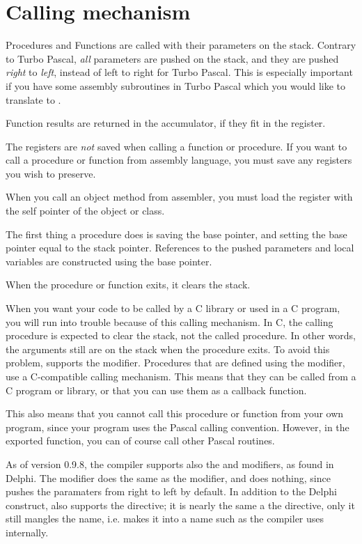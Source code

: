 \section{Calling mechanism}
\label{se:Calling}
Procedures and Functions are called with their parameters on the stack.
Contrary to Turbo Pascal, {\em all} parameters are pushed on the stack, and
they are pushed {\em right} to {\em left}, instead of left to right for
Turbo Pascal. This is especially important if you have some assembly
subroutines in Turbo Pascal which you would like to translate to \fpc.

Function results are returned in the accumulator, if they fit in the
register.

The registers are {\em not} saved when calling a function or procedure. If
you want to call a procedure or function from assembly language, you must
save any registers you wish to preserve.

When you call an object method from assembler, you must load the 
register with the self pointer of the object or class.

The first thing a procedure does is saving the base pointer, and setting the
base pointer equal to the stack pointer. References to the pushed parameters
and local variables are constructed using the base pointer.

When the procedure or function exits, it clears the stack.

When you want your code to be called by a C library or used in a C
program, you will run into trouble because of this calling mechanism. In C,
the calling procedure is expected to clear the stack, not the called
procedure. In other words, the arguments still are on the stack when the
procedure exits. To avoid this problem, \fpc supports the 
modifier. Procedures that are defined using the  modifier, use a
C-compatible calling mechanism. This means that they can be called from a
C program or library, or that you can use them as a callback function.

This also means that you cannot call this procedure or function from your
own program, since your program uses the Pascal calling convention.
However, in the exported function, you can of course call other Pascal
routines.

As of version 0.9.8, the \fpc compiler supports also the  and
 modifiers, as found in Delphi. The  modifier does
the same as the  modifier, and  does nothing, since
\fpc pushes the paramaters from right to left by default.
In addition to the Delphi  construct, \fpc also supports the
 directive; it is nearly the same a the  directive,
only it still mangles the name, i.e. makes it into a name such as the
compiler uses internally.

